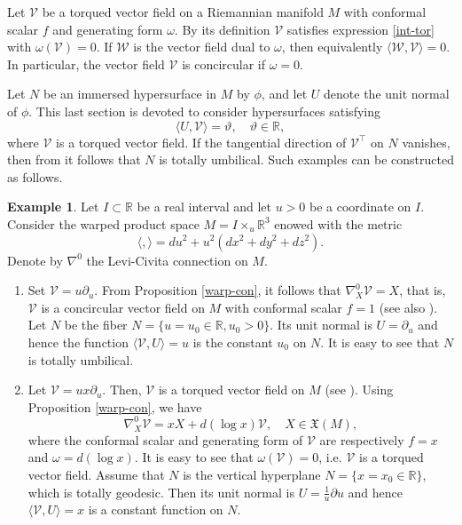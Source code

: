 \documentclass[12pt]{amsart}
\def\r{\mathbb R}
\def\v{\mathcal V}
\def\w{\mathcal W}
\def\x{\mathfrak X}
\theoremstyle{definition}
\newtheorem{example}[theorem]{Example}
\begin{document}
Let $\v$ be a torqued vector field on a Riemannian manifold $M$ with conformal scalar $f$ and generating form $\omega$. By its definition $\v$ satisfies expression \eqref{int-tor} with $\omega(\v)=0$. If $\w$ is the vector field dual to $\omega$, then equivalently $\langle \w,\v\rangle=0$. In particular, the vector field $\v$ is concircular if $\omega=0$.

Let $N$ be an immersed hypersurface in $M$ by $\phi$, and let $U$ denote the unit normal of $\phi$. This last section is devoted to consider hypersurfaces satisfying
\begin{equation} \label{51}
\langle U, \v \rangle =\vartheta, \quad \vartheta \in \r,
\end{equation}
where $\v$ is a torqued vector field. If the tangential direction of $\v^{\top}$ on $N$ vanishes, then from \cite[Proposition 4. 7]{amc1} it follows that $N$ is totally umbilical. Such examples can be constructed as follows.

\begin{example}\label{5e1}
Let $I\subset \r$ be a real interval and let $u>0$ be a coordinate on $I$. Consider the warped product space $M=I\times_u \r^3$ enowed with the metric
$$
\langle , \rangle=du^2+u^2(dx^2+dy^2+dz^2).
$$ 
Denote by $\nabla^0$ the Levi-Civita connection on $M$.
\begin{enumerate}
\item Set $\v=u\partial_u$. From Proposition \ref{warp-con}, it follows that $\nabla^0_X \v=X$, that is, $\v$ is a concircular vector field on $M$ with conformal scalar $f=1$ (see also \cite[Example 1.1]{cbook}). Let $N$ be the fiber $N=\{u=u_0\in\r,u_0>0\}$. Its unit normal is $U=\partial_u$ and hence the function $\langle \v,U \rangle=u$ is the constant $u_0$ on $N$. It is easy to see that $N$ is totally umbilical.
\item Let $\v=ux\partial_u$. Then, $\v$ is a torqued vector field on $M$ (see \cite[Theorem 2.3]{c01}). Using Proposition \ref{warp-con}, we have
$$
\nabla^0_X \v=x X+d(\log x) \v, \quad X\in\x(M),
$$
where the conformal scalar and generating form of $\v$ are respectively $f=x$ and $\omega=d(\log x)$. It is easy to see that $\omega(\v)=0$, i.e. $\v$ is a torqued vector field. Assume that $N$ is the vertical hyperplane $N=\{x=x_0\in\r\}$, which is totally geodesic. Then its unit normal is $U=\frac1u\partial u$ and hence $\langle \v,U\rangle=x$ is a constant function on $N$.
\end{enumerate}
\end{example}
\end{document}
